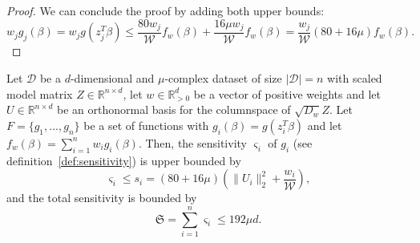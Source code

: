 \begin{proof}
    We can conclude the proof by adding both upper bounds:
    \begin{equation*}
        w_j g_j(\beta)
        = w_j g(z_j^T \beta) \leq \frac{80 w_j}{\mathcal{W}} f_w(\beta)
        + \frac{16 \mu w_j}{\mathcal{W}} f_w(\beta)
        = \frac{w_j}{\mathcal{W}} (80 + 16 \mu) f_w(\beta).
    \end{equation*}
\end{proof}

\begin{lemma}
    Let $\mathcal{D}$ be a $d$-dimensional and $\mu$-complex dataset of size
    $|\mathcal{D}|=n$ with scaled model matrix
    $Z \in \mathbb{R}^{n \times d}$, let $w \in \mathbb{R}^d_{>0}$
    be a vector of positive weights and let
    $U \in \mathbb{R}^{n \times d }$ be an orthonormal basis for
    the columnspace of $\sqrt{D_w}Z$.
    Let $F = \{g_1, ..., g_n\}$ be a set of functions with
    $g_i(\beta) = g(z_i^T \beta)$ and let
    $f_w(\beta) = \sum_{i=1}^n w_ig_i(\beta)$.
    Then, the sensitivity $\varsigma_i$ of $g_i$
    (see definition~\ref{def:sensitivity}) is upper bounded by
    \begin{equation*}
        \varsigma_i \leq s_i
        = (80 + 16\mu)(\lVert U_i \rVert_2^2 + \frac{w_i}{\mathcal{W}}),
    \end{equation*}
    and the total sensitivity is bounded by
    \begin{equation*}
        \mathfrak{S} = \sum_{i=1}^n \varsigma_i \leq 192 \mu d.
    \end{equation*}
\end{lemma}
